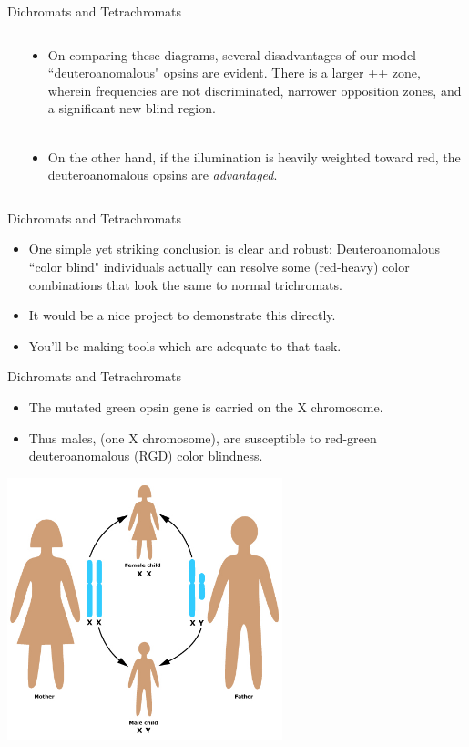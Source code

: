 \documentclass{beamer}
\begin{document}
\begin{frame}{Dichromats and Tetrachromats}
\begin{columns}
\begin{column}{0.15\textwidth}
   \end{column}
   \begin{column}{0.85\textwidth}
      \begin{itemize}
         \item On comparing these diagrams, several disadvantages of our model ``deuteroanomalous" opsins are evident. There is a larger ++ zone, wherein frequencies are not discriminated, narrower opposition zones, and a significant new blind region.
         \\~\\
         \item On the other hand, if the illumination is heavily weighted toward red, the deuteroanomalous opsins are {\it advantaged}.
      \end{itemize}
   \end{column}
   \end{columns}
\end{frame}

\begin{frame}{Dichromats and Tetrachromats}
   \begin{itemize}
      \item One simple yet striking conclusion is clear and robust: Deuteroanomalous ``color blind" individuals actually can resolve some (red-heavy) color combinations that look the same to normal trichromats.
      \item It would be a nice project to demonstrate this directly.
      \item You'll be making tools which are adequate to that task.
   \end{itemize}
\end{frame}

\begin{frame}{Dichromats and Tetrachromats}
   \begin{itemize}
      \item The mutated green opsin gene is carried on the X chromosome.
      \item Thus males, (one X chromosome), are susceptible to red-green deuteroanomalous (RGD) color blindness.
   \end{itemize}
   \begin{center}
      \includegraphics[width=0.6\textwidth]{figures/XY.jpg}
   \end{center}
\end{frame}
\end{document}
